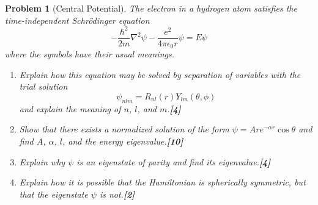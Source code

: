 \documentclass[a4paper]{article}
\theoremstyle{new}
\newtheorem{qns}{Problem}[subsection]
\begin{document}
\begin{qns}[Central Potential]
The electron in a hydrogen atom satisfies the time-independent Schrödinger equation
$$-\frac{\hbar^2}{2m}\nabla^2\psi-\frac{e^2}{4\pi\epsilon_0r}\psi=E\psi$$
where the symbols have their usual meanings.
\begin{enumerate}[label=(\roman*)]
\item Explain how this equation may be solved by separation of variables with the trial solution
$$\psi_{nlm}=R_{nl}(r)Y_{lm}(\theta,\phi)$$
and explain the meaning of $n$, $l$, and $m$.\hfill\textbf{[4]}
\item Show that there exists a normalized solution of the form $\psi=A re^{-\alpha r}\cos\theta$ and find $A$, $\alpha$, $l$, and the energy eigenvalue.\hfill\textbf{[10]}
\item Explain why $\psi$ is an eigenstate of parity and find its eigenvalue.\hfill\textbf{[4]}
\item Explain how it is possible that the Hamiltonian is spherically symmetric, but that the eigenstate $\psi$ is not.\hfill\textbf{[2]}
\end{enumerate}
\end{qns}
\end{document}
